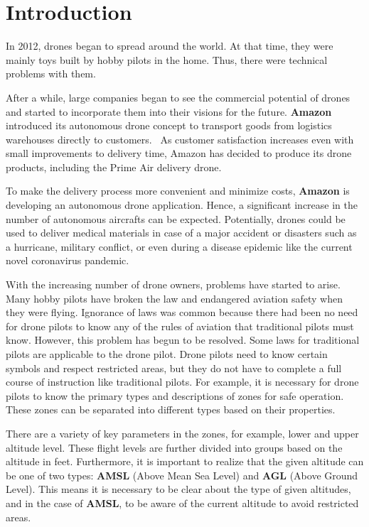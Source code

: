 \chapter{Introduction}\label{ch:introduction}
In 2012, drones began to spread around the world.
At that time, they were mainly toys built by hobby pilots in the home.
Thus, there were technical problems with them.

After a while, large companies began to see the commercial potential of drones and started to incorporate them into their visions for the future.
\textbf{Amazon} introduced its autonomous drone concept to transport goods from logistics warehouses directly to customers.~\cite{amazonArticle}
As customer satisfaction increases even with small improvements to delivery time, Amazon has decided to produce its drone products, including the Prime Air delivery drone.

To make the delivery process more convenient and minimize costs, \textbf{Amazon} is developing an autonomous drone application.
Hence, a significant increase in the number of autonomous aircrafts can be expected.
Potentially, drones could be used to deliver medical materials in case of a major accident or disasters such as a hurricane, military conflict, or even during a disease epidemic like the current novel coronavirus pandemic.

With the increasing number of drone owners, problems have started to arise.
Many hobby pilots have broken the law and endangered aviation safety when they were flying.
Ignorance of laws was common because there had been no need for drone pilots to know any of the rules of aviation that traditional pilots must know.
However, this problem has begun to be resolved.
Some laws for traditional pilots are applicable to the drone pilot.
Drone pilots need to know certain symbols and respect restricted areas, but they do not have to complete a full course of instruction like traditional pilots.
For example, it is necessary for drone pilots to know the primary types and descriptions of zones for safe operation.
These zones can be separated into different types based on their properties.

There are a variety of key parameters in the zones, for example, lower and upper altitude level.
These flight levels are further divided into groups based on the altitude in feet.
Furthermore, it is important to realize that the given altitude can be one of two types: \textbf{AMSL} (Above Mean Sea Level) and \textbf{AGL} (Above Ground Level).
This means it is necessary to be clear about the type of given altitudes, and in the case of \textbf{AMSL}, to be aware of the current altitude to avoid restricted areas.


